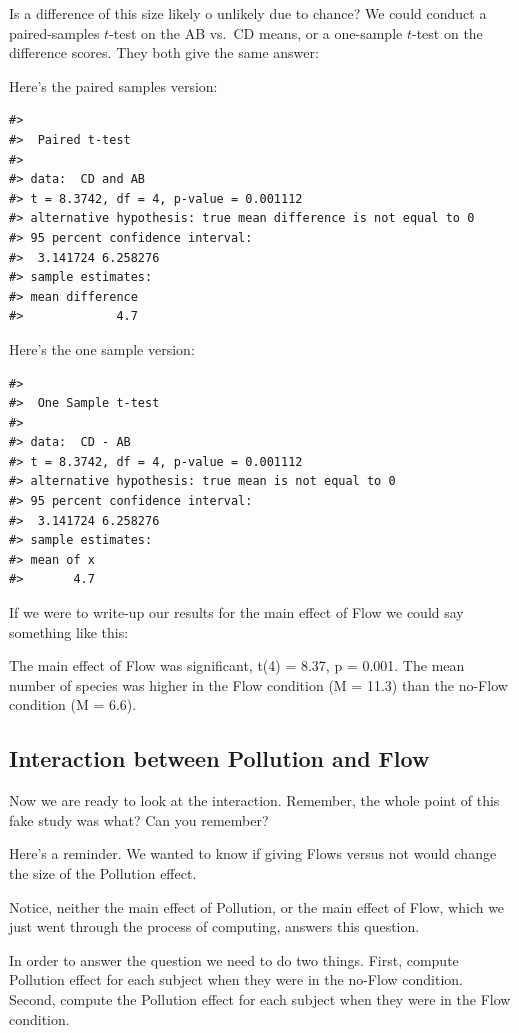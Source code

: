 \documentclass[
  letterpaper,
  DIV=11,
  numbers=noendperiod]{scrreprt}
\begin{document}
Is a difference of this size likely o unlikely due to chance? We could
conduct a paired-samples \(t\)-test on the AB vs.~CD means, or a
one-sample \(t\)-test on the difference scores. They both give the same
answer:

Here's the paired samples version:

\begin{verbatim}
#> 
#>  Paired t-test
#> 
#> data:  CD and AB
#> t = 8.3742, df = 4, p-value = 0.001112
#> alternative hypothesis: true mean difference is not equal to 0
#> 95 percent confidence interval:
#>  3.141724 6.258276
#> sample estimates:
#> mean difference 
#>             4.7
\end{verbatim}

Here's the one sample version:

\begin{verbatim}
#> 
#>  One Sample t-test
#> 
#> data:  CD - AB
#> t = 8.3742, df = 4, p-value = 0.001112
#> alternative hypothesis: true mean is not equal to 0
#> 95 percent confidence interval:
#>  3.141724 6.258276
#> sample estimates:
#> mean of x 
#>       4.7
\end{verbatim}

If we were to write-up our results for the main effect of Flow we could
say something like this:

The main effect of Flow was significant, t(4) = 8.37, p = 0.001. The
mean number of species was higher in the Flow condition (M = 11.3) than
the no-Flow condition (M = 6.6).

\subsection{Interaction between Pollution and
Flow}\label{interaction-between-pollution-and-flow}

Now we are ready to look at the interaction. Remember, the whole point
of this fake study was what? Can you remember?

Here's a reminder. We wanted to know if giving Flows versus not would
change the size of the Pollution effect.

Notice, neither the main effect of Pollution, or the main effect of
Flow, which we just went through the process of computing, answers this
question.

In order to answer the question we need to do two things. First, compute
Pollution effect for each subject when they were in the no-Flow
condition. Second, compute the Pollution effect for each subject when
they were in the Flow condition.
\end{document}

